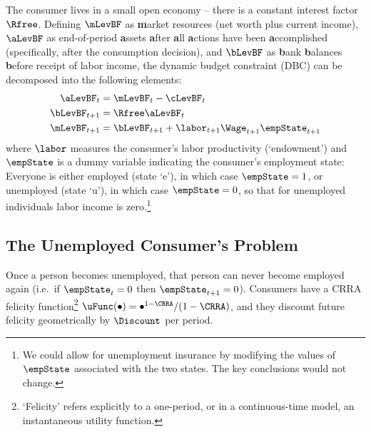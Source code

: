 \documentclass{\handout}
\begin{document}
The consumer lives in a small open economy -- there is a constant interest factor $\Rfree$.  Defining $\mLevBF$ as {\bf m}arket resources (net worth plus current income), $\aLevBF$ as end-of-period {\bf a}ssets {\bf a}fter {\bf a}ll {\bf a}ctions have been {\bf a}ccomplished (specifically, after the consumption decision), and $\bLevBF$ as {\bf b}ank {\bf b}alances {\bf b}efore receipt of labor income, the dynamic budget constraint (DBC) can be decomposed into the following elements:
\begin{equation}\begin{gathered}\begin{aligned}
    \aLevBF_{t} & =  \mLevBF_{t}-\cLevBF_{t}
\\  \bLevBF_{t+1} & =  \Rfree \aLevBF_{t}
\\  \mLevBF_{t+1} & =  \bLevBF_{t+1}+\labor_{t+1}\Wage_{t+1}\empState_{t+1}  \label{eq:DBC}
\end{aligned}\end{gathered}\end{equation}
where $\labor$ measures the consumer's labor productivity
(`endowment') and $\empState$ is a dummy variable indicating the
consumer's employment state: Everyone is either
employed (state `e'), in which case $\empState = 1$, or unemployed
(state `u'), in which case $\empState=0$, so that for unemployed
individuals labor income is zero.\footnote{We could allow for
  unemployment insurance by modifying the values of $\empState$
  associated with the two states.  The key conclusions would not
  change.}

\pagebreak 
{} %
\subsection{The Unemployed Consumer's Problem} \label{subsec:Fred}

Once a person becomes unemployed, that person can never become
employed again (i.e.\ if $\empState_{t}=0$ then $\empState_{t+1}=0$).
Consumers have a CRRA felicity function\footnote{`Felicity' refers
  explicitly to a one-period, or in a continuous-time model, an
  instantaneous utility function.}
$\uFunc(\bullet)= \bullet^{1-\CRRA}/(1-\CRRA)$, and they discount
future felicity geometrically by $\Discount$ per period.
\end{document}
